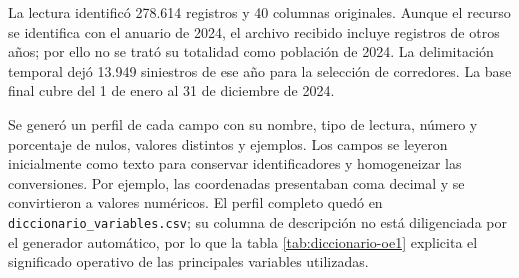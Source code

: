 \documentclass[12pt,letterpaper]{article}
\begin{document}
La lectura identificó 278.614 registros y 40 columnas originales. Aunque
el recurso se identifica con el anuario de 2024, el archivo recibido
incluye registros de otros años; por ello no se trató su totalidad como
población de 2024. La delimitación temporal dejó 13.949 siniestros de ese
año para la selección de corredores. La base final cubre del 1 de enero
al 31 de diciembre de 2024.

Se generó un perfil de cada campo con su nombre, tipo de lectura,
número y porcentaje de nulos, valores distintos y ejemplos. Los campos
se leyeron inicialmente como texto para conservar identificadores y
homogeneizar las conversiones. Por ejemplo, las coordenadas presentaban
coma decimal y se convirtieron a valores numéricos. El perfil completo
quedó en \texttt{diccionario\_variables.csv}; su columna de descripción
no está diligenciada por el generador automático, por lo que la tabla
\ref{tab:diccionario-oe1} explicita el significado operativo de las
principales variables utilizadas.
\end{document}
